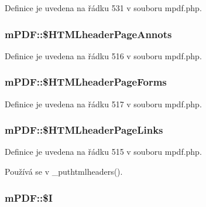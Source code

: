 Definice je uvedena na řádku 531 v souboru mpdf.\-php.

\hypertarget{classm_p_d_f_a54e852272422f94522d6d027cea57733}{
\subsubsection[{\$\-H\-T\-M\-Lheader\-Page\-Annots}]{\setlength{\rightskip}{0pt plus 5cm}m\-P\-D\-F\-::\$\-H\-T\-M\-Lheader\-Page\-Annots}}\label{classm_p_d_f_a54e852272422f94522d6d027cea57733}


Definice je uvedena na řádku 516 v souboru mpdf.\-php.

\hypertarget{classm_p_d_f_ada74a3da5b8e7e2577dd66cd05fae9fe}{
\subsubsection[{\$\-H\-T\-M\-Lheader\-Page\-Forms}]{\setlength{\rightskip}{0pt plus 5cm}m\-P\-D\-F\-::\$\-H\-T\-M\-Lheader\-Page\-Forms}}\label{classm_p_d_f_ada74a3da5b8e7e2577dd66cd05fae9fe}


Definice je uvedena na řádku 517 v souboru mpdf.\-php.

\hypertarget{classm_p_d_f_a36a156c638bd2c7f15f72a08c208e6e3}{
\subsubsection[{\$\-H\-T\-M\-Lheader\-Page\-Links}]{\setlength{\rightskip}{0pt plus 5cm}m\-P\-D\-F\-::\$\-H\-T\-M\-Lheader\-Page\-Links}}\label{classm_p_d_f_a36a156c638bd2c7f15f72a08c208e6e3}


Definice je uvedena na řádku 515 v souboru mpdf.\-php.



Používá se v \-\_\-puthtmlheaders().

\hypertarget{classm_p_d_f_a5d433c49defc41dff313fce6c5bf7969}{
\subsubsection[{\$\-I}]{\setlength{\rightskip}{0pt plus 5cm}m\-P\-D\-F\-::\$\-I}}\label{classm_p_d_f_a5d433c49defc41dff313fce6c5bf7969}



